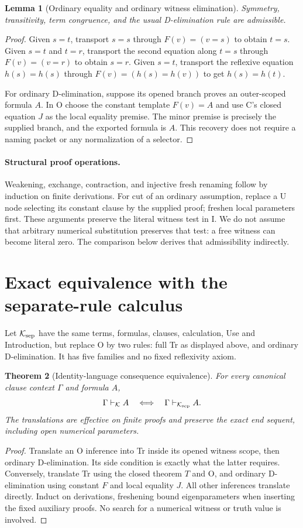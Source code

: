 \documentclass[11pt]{article}
\newtheorem{theorem}{Theorem}[section]
\newtheorem{lemma}[theorem]{Lemma}
\theoremstyle{definition}\newtheorem{definition}[theorem]{Definition}
\newcommand{\K}{\mathcal K}
\begin{document}
\begin{lemma}[Ordinary equality and ordinary witness elimination]
Symmetry, transitivity, term congruence, and the usual D-elimination
rule are admissible.
\end{lemma}
\begin{proof}
Given $s=t$, transport $s=s$ through $F(v)=(v=s)$ to obtain $t=s$.
Given $s=t$ and $t=r$, transport the second equation along $t=s$
through $F(v)=(v=r)$ to obtain $s=r$. Given $s=t$, transport the
reflexive equation $h(s)=h(s)$ through $F(v)=(h(s)=h(v))$ to get
$h(s)=h(t)$.

For ordinary D-elimination, suppose its opened branch proves an
outer-scoped formula $A$. In O choose the constant template $F(v)=A$
and use C's closed equation $J$ as the local equality premise. The
minor premise is precisely the supplied branch, and the exported
formula is $A$. This recovery does not require a naming packet or
any normalization of a selector.
\end{proof}

\paragraph{Structural proof operations.}
Weakening, exchange, contraction, and injective fresh renaming follow
by induction on finite derivations. For cut of an ordinary assumption,
replace a U node selecting its constant clause by the supplied proof;
freshen local parameters first. These arguments preserve the literal
witness test in I. We do not assume that arbitrary numerical
substitution preserves that test: a free witness can become literal
zero. The comparison below derives that admissibility indirectly.

\section{Exact equivalence with the separate-rule calculus}

Let $\K_{\rm sep}$ have the same terms, formulas, clauses, calculation,
Use and Introduction, but replace O by two rules: full Tr as displayed
above, and ordinary D-elimination. It has five families and no fixed
reflexivity axiom.

\begin{theorem}[Identity-language consequence equivalence]
For every canonical clause context $\Gamma$ and formula $A$,
\[
 \Gamma\vdash_{\K}A\quad\Longleftrightarrow\quad
 \Gamma\vdash_{\K_{\rm sep}}A.
\]
The translations are effective on finite proofs and preserve the exact
end sequent, including open numerical parameters.
\end{theorem}
\begin{proof}
Translate an O inference into Tr inside its opened witness scope,
then ordinary D-elimination. Its side condition is exactly what the
latter requires. Conversely, translate Tr using the closed theorem $T$
and O, and ordinary D-elimination using constant $F$ and local equality
$J$. All other inferences translate directly. Induct on derivations,
freshening bound eigenparameters when inserting the fixed auxiliary
proofs. No search for a numerical witness or truth value is involved.
\end{proof}
\end{document}
